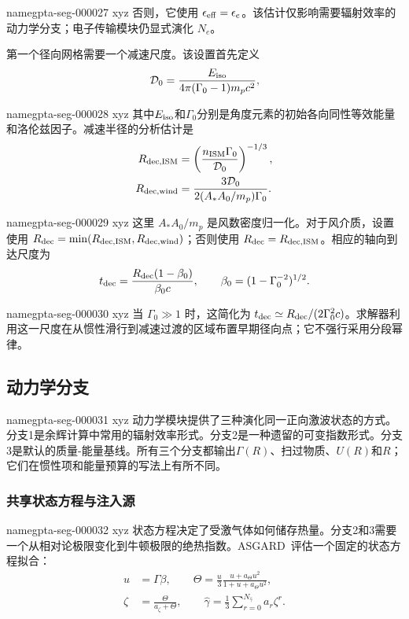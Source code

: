 \documentclass[twocolumn]{aastex702}
\makeatletter
\newcommand{\asgard}{\textsc{ASGARD}}
\providecommand{\gptareaderanchor}[1]{\pdfdest name{#1} xyz}%
\providecommand{\gptareaderanchor}[1]{\special{pdf:dest (#1) [ @thispage /XYZ @xpos @ypos null ]}}%
\makeatother
\begin{document}
\gptareaderanchor{gpta-seg-000027}%
否则，它使用 \(\epsilon_{\rm eff}=\epsilon_e\)。该估计仅影响需要辐射效率的动力学分支；电子传输模块仍显式演化 \(N_e\)。

第一个径向网格需要一个减速尺度。该设置首先定义
\begin{equation}
\mathcal{D}_0=
\frac{E_{\rm iso}}{4\pi(\Gamma_0-1)m_pc^2},
\end{equation}

\gptareaderanchor{gpta-seg-000028}%
其中\(E_{\rm iso}\)和\(\Gamma_0\)分别是角度元素的初始各向同性等效能量和洛伦兹因子。减速半径的分析估计是
\begin{equation}
\begin{aligned}
R_{\rm dec,ISM}
&=\left(\frac{n_{\rm ISM}\Gamma_0}{\mathcal{D}_0}\right)^{-1/3},\\
R_{\rm dec,wind}
&=\frac{3\mathcal{D}_0}{2(A_\ast A_0/m_p)\Gamma_0}.
\end{aligned}
\end{equation}

\gptareaderanchor{gpta-seg-000029}%
这里 \(A_\ast A_0/m_p\) 是风数密度归一化。对于风介质，设置使用 \(R_{\rm dec}=\min(R_{\rm dec,ISM},R_{\rm dec,wind})\)；否则使用 \(R_{\rm dec}=R_{\rm dec,ISM}\)。相应的轴向到达尺度为
\[
t_{\rm dec}=\frac{R_{\rm dec}(1-\beta_0)}{\beta_0c},
\qquad
\beta_0=(1-\Gamma_0^{-2})^{1/2}.
\]

\gptareaderanchor{gpta-seg-000030}%
当 \(\Gamma_0\gg1\) 时，这简化为 \(t_{\rm dec}\simeq R_{\rm dec}/(2\Gamma_0^2c)\)。求解器利用这一尺度在从惯性滑行到减速过渡的区域布置早期径向点；它不强行采用分段幂律。

\subsection{动力学分支}


\gptareaderanchor{gpta-seg-000031}%
动力学模块提供了三种演化同一正向激波状态的方式。分支1是余辉计算中常用的辐射效率形式\citep{BlandfordMcKee1976,HuangDaiLu1999}。分支2是一种遗留的可变指数形式。分支3是默认的质量-能量基线。所有三个分支都输出\(\Gamma(R)\)、扫过物质、\(U(R)\)和\(R\)；它们在惯性项和能量预算的写法上有所不同。

\subsubsection{共享状态方程与注入源}


\gptareaderanchor{gpta-seg-000032}%
状态方程决定了受激气体如何储存热量。分支2和3需要一个从相对论极限变化到牛顿极限的绝热指数。\asgard\ 评估一个固定的状态方程拟合：
\begin{equation}
\begin{aligned}
u&=\Gamma\beta,\qquad
\Theta=\frac{u}{3}\frac{u+a_\Theta u^2}{1+u+a_\Theta u^2},\\
\zeta&=\frac{\Theta}{a_\zeta+\Theta},\qquad
\hat{\gamma}=
\frac{1}{3}\sum_{r=0}^{N_{\hat\gamma}}a_r\zeta^r .
\end{aligned}
\end{equation}
\end{document}
